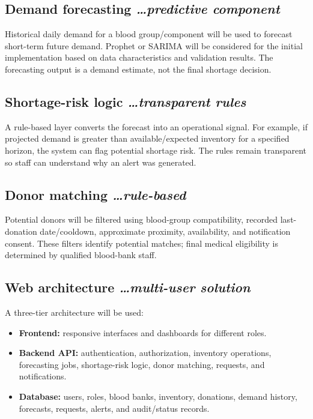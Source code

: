 \documentclass[11pt,a4paper]{article}
\newcommand{\BvrHint}[1]{{\normalfont\normalsize\itshape\hfill #1}}
\begin{document}
\subsection{Demand forecasting \BvrHint{\ldots predictive component}}
Historical daily demand for a blood group/component will be used to forecast short-term future demand. Prophet or SARIMA will be considered for the initial implementation based on data characteristics and validation results. The forecasting output is a demand estimate, not the final shortage decision.

\subsection{Shortage-risk logic \BvrHint{\ldots transparent rules}}
A rule-based layer converts the forecast into an operational signal. For example, if projected demand is greater than available/expected inventory for a specified horizon, the system can flag potential shortage risk. The rules remain transparent so staff can understand why an alert was generated.

\subsection{Donor matching \BvrHint{\ldots rule-based}}
Potential donors will be filtered using blood-group compatibility, recorded last-donation date/cooldown, approximate proximity, availability, and notification consent. These filters identify potential matches; final medical eligibility is determined by qualified blood-bank staff.

\subsection{Web architecture \BvrHint{\ldots multi-user solution}}
A three-tier architecture will be used:
\begin{itemize}[leftmargin=0.7cm]
\item \textbf{Frontend:} responsive interfaces and dashboards for different roles.
\item \textbf{Backend API:} authentication, authorization, inventory operations, forecasting jobs, shortage-risk logic, donor matching, requests, and notifications.
\item \textbf{Database:} users, roles, blood banks, inventory, donations, demand history, forecasts, requests, alerts, and audit/status records.
\end{itemize}
\end{document}

